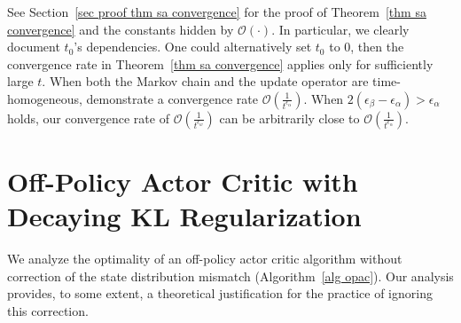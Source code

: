 \documentclass[twoside,11pt]{article}
\newcommand{\fO}{\mathcal{O}}
\numberwithin{assucounter}{section}
\begin{document}
\noindent See Section~\ref{sec proof thm sa convergence} for the proof of Theorem~\ref{thm sa convergence} and the constants hidden by $\fO(\cdot)$. 
In particular,
we clearly document $t_0$'s dependencies.
One could alternatively set $t_0$ to 0,
then the convergence rate in Theorem~\ref{thm sa convergence} applies only for sufficiently large $t$.
When both the Markov chain and the update operator are time-homogeneous,  
\citet{chen2021lyapunov} demonstrate a convergence rate $\fO\left(\frac{1}{t^{\epsilon_\alpha}}\right)$.
When $2(\epsilon_\beta - \epsilon_\alpha) > \epsilon_\alpha$ holds,
our convergence rate of $\fO\left(\frac{1}{t^{\epsilon_w}}\right)$ can be arbitrarily close to $\fO\left(\frac{1}{t^{\epsilon_\alpha}}\right)$.

\section{Off-Policy Actor Critic with Decaying KL Regularization}
\label{sec opac}
We analyze the optimality of an off-policy actor critic algorithm without correction of the state distribution mismatch (Algorithm~\ref{alg opac}).
Our analysis provides,
to some extent,
a theoretical justification for the practice of ignoring this correction.
\end{document}
